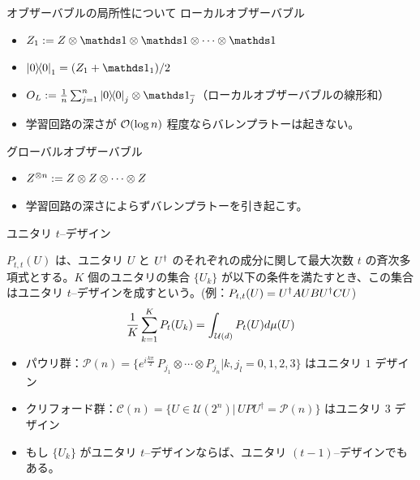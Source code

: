 \documentclass[dvipdfmx,10pt,aspectratio=169]{beamer}
\begin{document}
\begin{frame}{オブザーバブルの局所性について}
    ローカルオブザーバブル
    \begin{itemize}
        \item $Z_1 := Z \ot \bbid \ot \bbid \ot \cdots \ot \bbid$
        \item $\dyad{0}_1 = (Z_1 + \bbid_1)/2$
        \item $O_L := \frac1n \sum_{j=1}^{n}\dyad{0}_{j} \otimes \bbid_{\bar{j}}$（ローカルオブザーバブルの線形和）
        \item 学習回路の深さが $\order{\log{n}}$ 程度ならバレンプラトーは起きない。
    \end{itemize}
    
    グローバルオブザーバブル
    \begin{itemize}
        \item $Z^{\otimes {n}} := Z \otimes Z \otimes \cdots \otimes Z$
        \item 学習回路の深さによらずバレンプラトーを引き起こす。
    \end{itemize}
\end{frame}



\begin{frame}{ユニタリ $t$--デザイン}
    \begin{definition}
        $P_{t,t}(U)$ は、ユニタリ $U$ と $U^\dagger$ のそれぞれの成分に関して最大次数 $t$ の斉次多項式とする。$K$ 個のユニタリの集合 $\{U_k\}$ が以下の条件を満たすとき、この集合はユニタリ $t$--デザインを成すという。(例：$P_{t,t}(U) = U^\dagger AUBU^\dagger CU$)
        \begin{align*}
            \frac1K \sum_{k=1}^{K} P_{t}(U_k) = \int_{\mathcal{U}(d)}P_{t} (U) d\mu(U)
        \end{align*}
    \end{definition}

    \begin{itemize}
        \item パウリ群：$\mathcal{P}(n)=\{e^{i\frac{k\pi}{2}}\, P_{j_1}\otimes \cdots\otimes P_{j_n}| k,j_l=0,1,2,3\}$ はユニタリ $1$ デザイン
        \item クリフォード群：$\mathcal{C}(n)=\{U\in \mathcal{U}(2^n)|\,UPU^\dagger = \mathcal{P}(n)\}$ はユニタリ $3$ デザイン
        \item もし $\{U_k\}$ がユニタリ $t$--デザインならば、ユニタリ $(t-1)$--デザインでもある。
    \end{itemize}

\end{frame}
\end{document}
